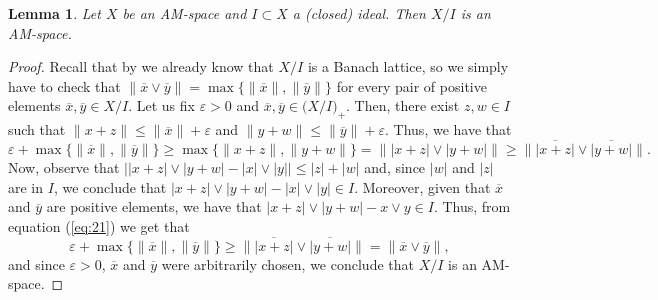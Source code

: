 \documentclass[11pt]{amsart}
\newtheorem{lem}[thm]{Lemma}
\theoremstyle{definition}
\numberwithin{equation}{section}
\begin{document}
\begin{lem}
Let $X$ be an AM-space and $I\subset X$ a (closed) ideal. Then $X/ I$ is an AM-space.
\end{lem}
\begin{proof}
Recall that by \cite[Corollary 1.3.14]{M-N-book} we already know that $X/I$ is a Banach lattice, so we simply have to check that $\|\overline{x}\lor \overline{y}\|=\max\{\|\overline{x}\|, \|\overline{y}\|\}$ for every pair of positive elements $\overline{x}, \overline{y}\in X/I$. Let us fix $\varepsilon>0$ and $\overline{x},\overline{y}\in \bigl(X/I\bigr)_+$. Then, there exist $z,w\in I$ such that $\|x+z\|\leq \|\overline{x}\|+\varepsilon$ and $\|y+w\|\leq \|\overline{y}\|+\varepsilon$. Thus, we have that
\begin{equation}\label{eq:21}
 \varepsilon+ \max\{\|\overline{x}\|, \|\overline{y}\|\}\geq \max\{\|x+z\|,\|y+w\|\}=\bigl\||x+z|\lor |y+w|\bigr\|\geq \bigl\|\overline{|x+z|}\lor \overline{|y+w|}\bigr\|.   
\end{equation}
Now, observe that %
$\bigl||x+z|\lor |y+w|- |x|\lor |y| \bigr|\leq |z|+|w|$ and, since  $|w|$ and $|z|$ are in $I$, we conclude that $|x+z|\lor |y+w|- |x|\lor |y|\in I$. Moreover, given that $\overline{x}$ and $\overline{y}$ are positive elements, we have that $|x+z|\lor |y+w|-x\lor y \in I$. Thus, from equation (\ref{eq:21}) we get that
$$ \varepsilon+ \max\{\|\overline{x}\|, \|\overline{y}\|\}\geq \bigl\|\overline{|x+z|}\lor \overline{|y+w|}\bigr\|=\| \overline{x}\lor \overline{y}\|,$$
and since $\varepsilon>0$, $\overline{x}$ and $\overline{y}$ were arbitrarily chosen, we conclude that $X/I$ is an AM-space.
\end{proof}
\end{document}
